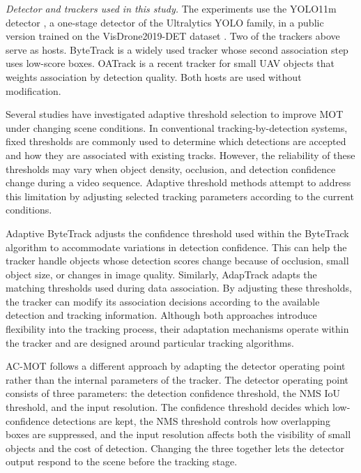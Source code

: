 \documentclass[pdflatex,sn-mathphys-num,iicol]{sn-jnl}
\makeatletter
\def\subsubsectionfont{\reset@font\fontsize{9bp}{11bp}\bfseries\selectfont\raggedright\boldmath}
\renewcommand\subsubsection{\@startsection{subsubsection}{3}{\z@}{-6pt \@plus -2pt \@minus -2pt}{2pt}{\subsubsectionfont}}
\makeatother
\begin{document}
\emph{Detector and trackers used in this study.} The experiments use the YOLO11m detector \cite{jocher2024yolo11}, a
one-stage detector of the Ultralytics YOLO family, in a public version trained
on the VisDrone2019-DET dataset \cite{zhu2022visdrone}. Two of the trackers
above serve as hosts. ByteTrack \cite{zhang2022bytetrack} is a widely used
tracker whose second association step uses low-score boxes. OATrack
\cite{qi2026oatrack} is a recent tracker for small UAV objects that weights
association by detection quality. Both hosts are used without modification.

\subsubsection{Adaptive Threshold Selection in MOT}
Several studies have investigated adaptive threshold selection to improve MOT under changing scene conditions. In conventional tracking-by-detection systems, fixed thresholds are commonly used to determine which detections are accepted and how they are associated with existing tracks. However, the reliability of these thresholds may vary when object density, occlusion, and detection confidence change during a video sequence. Adaptive threshold methods attempt to address this limitation by adjusting selected tracking parameters according to the current conditions.

Adaptive ByteTrack adjusts the confidence threshold used within the ByteTrack \cite{ma2023adaptivebytetrack} algorithm to accommodate variations in detection confidence. This can help the tracker handle objects whose detection scores change because of occlusion, small object size, or changes in image quality. Similarly, AdapTrack \cite{shim2024adaptrack} adapts the matching thresholds used during data association. By adjusting these thresholds, the tracker can modify its association decisions according to the available detection and tracking information. Although both approaches introduce flexibility into the tracking process, their adaptation mechanisms operate within the tracker and are designed around particular tracking algorithms.

AC-MOT follows a different approach by adapting the detector operating point rather than the internal parameters of the tracker. The detector operating point consists of three parameters: the detection confidence threshold, the NMS IoU threshold, and the input resolution. The confidence threshold decides which low-confidence detections are kept, the NMS threshold controls how overlapping boxes are suppressed, and the input resolution affects both the visibility of small objects and the cost of detection. Changing the three together lets the detector output respond to the scene before the tracking stage.
\end{document}
